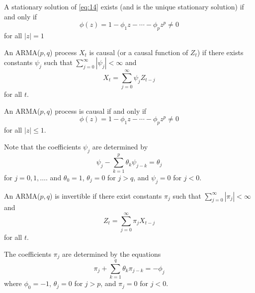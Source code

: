 \begin{thm}
  \label{defn:arma_processes:2}
  A stationary solution of \eqref{eq:14} exists (and is the unique
  stationary solution) if and only if
  \begin{equation}
    \label{eq:20}
    \phi(z) = 1 - \phi_{1} z - \cdots - \phi_{p} z^{p} \neq 0
  \end{equation} for all $|z| = 1$
\end{thm}

\begin{defn}
  \label{defn:arma_processes:3}
  An \textsc{ARMA}($p, q$) process $X_{t}$ is causal (or a causal function of
  $Z_{t}$) if there exists constants $\psi_{j}$ such that
  $\sum_{j=0}^{\infty} |\psi_{j}| < \infty$ and
  \begin{equation}
    \label{eq:21}
    X_{t} = \sum_{j=0}^{\infty} \psi_{j} Z_{t-j}
  \end{equation} for all $t$.
\end{defn}

\begin{thm}
  \label{defn:arma_processes:4}
  An \textsc{ARMA}($p, q$) process is causal if and only if
  \begin{equation}
    \label{eq:22}
    \phi(z) = 1 - \phi_{1} z - \cdots - \phi_{p} z^{p} \neq 0
  \end{equation} for all $|z| \leq 1$.

  Note that the coefficients $\psi_{j}$ are determined by
  \begin{equation}
    \label{eq:25}
    \psi_{j} - \sum_{k=1}^{p} \theta_{k} \psi_{j-k} = \theta_{j}
  \end{equation} for $j = 0, 1, \dots$.
  and $\theta_{0} = 1$, $\theta_{j} = 0$ for $j > q$, and $\psi_{j} =
  0$ for $j < 0$.
\end{thm}

\begin{defn}
  \label{defn:arma_processes:5}
  An \textsc{ARMA}($p, q$) is invertible if there exist constants $\pi_{j}$
  such that $\sum_{j=0}^{\infty} |\pi_{j}| < \infty$ and
  \begin{equation}
    \label{eq:23}
    Z_{t} = \sum_{j=0}^{\infty} \pi_{j} X_{t-j}
  \end{equation} for all $t$.

  The coefficients $\pi_{j}$ are determined by the equations
  \begin{equation}
    \label{eq:26}
    \pi_{j} + \sum_{k=1}^{q} \theta_{k} \pi_{j-k} = -\phi_{j}
  \end{equation}
  where $\phi_{0} = -1$, $\theta_{j} = 0$ for $j > p$, and $\pi_{j} =
  0$ for $j < 0$.
\end{defn}

